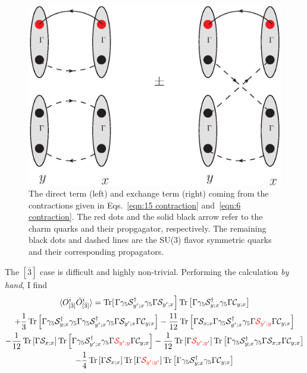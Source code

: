 \documentclass[11pt]{article}
\begin{document}
\begin{figure}
\center
\includegraphics[width=.5\columnwidth]{contract1.eps}
\caption{The direct term (left) and exchange term (right) coming from the contractions given in Eqs.~\eqref{eqn:15 contraction} and~\eqref{eqn:6 contraction}.  The red dots and the solid black arrow refer to the charm quarks and their propgagator, respectively.  The remaining black dots and dashed lines are the SU(3) flavor symmetric quarks and their corresponding propagators. \label{fig:15 and 6}}
\end{figure}
The $[\bar{3}]$ case is difficult and highly non-trivial.  Performing the calculation \emph{by hand}, I find
\begin{multline}\label{eqn:3b contraction}
\langle O^{i}_{[\bar3]}\bar{O}^{i}_{[\bar3]}\rangle=\operatorname{Tr}[\left.\Gamma \gamma_{5} \mathcal{S}_{y^{\prime} ; x}^{\dagger} \gamma_{5} \Gamma \mathcal{S}_{y^{\prime} ; x}\right] \operatorname{Tr}\left[\Gamma \gamma_{5} \mathcal{S}_{y ; x}^{\dagger} \gamma_{5} \Gamma \mathcal{C}_{y ; x}\right]\\
+\frac{1}{3} \operatorname{Tr}\left[\Gamma \gamma_{5} \mathcal{S}_{y ; x}^{\dagger} \gamma_{5} \Gamma \gamma_{5} \mathcal{S}_{y^{\prime} ; x}^{\dagger} \gamma_{5} \Gamma \mathcal{S}_{y^{\prime} ; x} \Gamma \mathcal{C}_{y ; x}\right] 
-\frac{11}{12} \operatorname{Tr}\left[\Gamma \mathcal{S}_{x ; x} \Gamma \gamma_{5} \mathcal{S}_{y^{\prime} ; x}^{\dagger} \gamma_{5} \Gamma{ \color{red}\mathcal{S}_{y^{\prime} ; y} }\Gamma \mathcal{C}_{y ; x}\right]\\
-\frac{1}{12}\operatorname{Tr}\left[\Gamma \mathcal{S}_{x ; x}\right]\operatorname{Tr}\left[ \Gamma \gamma_{5} \mathcal{S}_{y^{\prime} ; x}^{\dagger} \gamma_{5} \Gamma {\color{red}\mathcal{S}_{y^{\prime} ; y} }\Gamma \mathcal{C}_{y ; x}\right]
-\frac{1}{12}\operatorname{Tr}\left[\Gamma {\color{red}\mathcal{S}_{y' ; y'}}\right]\operatorname{Tr}\left[ \Gamma \gamma_{5} \mathcal{S}_{y ; x}^{\dagger} \gamma_{5} \Gamma \mathcal{S}_{x ; x} \Gamma \mathcal{C}_{y ; x}\right]\\
-\frac{1}{4}\operatorname{Tr}\left[\Gamma \mathcal{S}_{x ; x}\right]\operatorname{Tr}\left[\Gamma {\color{red}\mathcal{S}_{y' ; y'}}\right]\operatorname{Tr}\left[ \Gamma \gamma_{5} \mathcal{S}_{y ; x}^{\dagger} \gamma_{5} \Gamma  \mathcal{C}_{y ; x}\right]
\end{multline}
\end{document}
